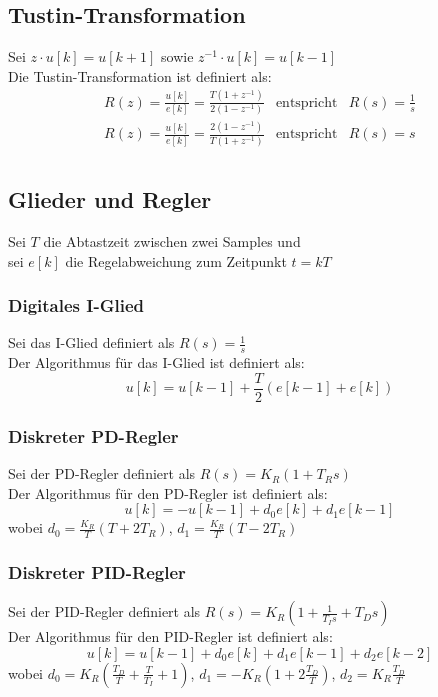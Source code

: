 \documentclass[10pt,a4paper]{article}
\renewcommand{\arraystretch}{1.5}
\newcommand{\tab}[1][1]{\hspace*{#1cm}}
\begin{document}
\subsection{Tustin-Transformation}
Sei $z ⋅ u[k] = u[k + 1]$ sowie $z^{-1} ⋅ u[k] = u[k-1]$ \\
Die Tustin-Transformation ist definiert als:
\renewcommand{\arraystretch}{2}
$$
	\begin{array}{lll}
		R(z) = \frac{u[k]}{e[k]} = \frac{T(1+z^{-1})}{2(1 - z^{-1})} & \text{entspricht} & R(s) = \frac 1 s \\
		R(z) = \frac{u[k]}{e[k]} = \frac{2(1-z^{-1})}{T(1 + z^{-1})} & \text{entspricht} & R(s) = s \\	
	\end{array}
$$
\renewcommand{\arraystretch}{1.5}
\subsection{Glieder und Regler}
Sei $T$ die Abtastzeit zwischen zwei Samples und \\
sei $e[k]$ die Regelabweichung zum Zeitpunkt $t = kT$ \\

\subsubsection{Digitales I-Glied}
Sei das I-Glied definiert als $R(s) = \frac 1 s$ \\
Der Algorithmus für das I-Glied ist definiert als:
$$
u[k] = u[k-1] + \frac T 2 (e[k-1] + e[k])
$$

\subsubsection{Diskreter PD-Regler}
Sei der PD-Regler definiert als $R(s) = K_R(1 + T_R s)$ \\
Der Algorithmus für den PD-Regler ist definiert als:
$$
	u[k] = -u[k-1] + d_0e[k] + d_1e[k-1]
$$
wobei \tab $d_0 = \frac{K_R}{T}(T + 2T_R)$, \tab $d_1 = \frac{K_R}{T}(T - 2T_R)$

\subsubsection{Diskreter PID-Regler}
Sei der PID-Regler definiert als $R(s) = K_R(1 + \frac{1}{T_I s} + T_D s)$ \\
Der Algorithmus für den PID-Regler ist definiert als:
$$
	u[k] = u[k-1] + d_0e[k] + d_1e[k-1] + d_2e[k-2]
$$
wobei \tab $d_0 = K_R(\frac{T_D}{T} + \frac{T}{T_I} + 1)$, \tab $d_1 = -K_R(1 + 2\frac{T_D}{T})$, \tab $d_2 = K_R \frac{T_D}{T}$
\end{document}

